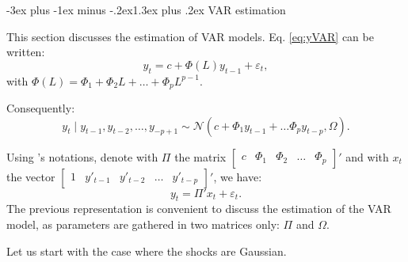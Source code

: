 \documentclass[
  11pt,
]{book}
\makeatletter
\renewcommand\section{\@startsection{section}{1}{\z@}
  {-3ex plus -1ex minus -.2ex}{1.3ex plus .2ex}
  {\normalfont\Large\bfseries\color{TextbookInk}}}
\theoremstyle{definition}
\theoremstyle{definition}
\theoremstyle{definition}
\theoremstyle{definition}
\theoremstyle{remark}
\makeatother
\begin{document}
\section{VAR estimation}\label{estimVAR}

This section discusses the estimation of VAR models. Eq. \eqref{eq:yVAR} can be written:
\[
y_{t}=c+\Phi(L)y_{t-1}+\varepsilon_{t},
\]
with \(\Phi(L) = \Phi_1 + \Phi_2 L + \dots + \Phi_p L^{p-1}\).

Consequently:
\[
y_{t}\mid y_{t-1},y_{t-2},\ldots,y_{-p+1}\sim \mathcal{N}(c+\Phi_{1}y_{t-1}+\ldots\Phi_{p}y_{t-p},\Omega).
\]

Using \citet{Hamilton_1994}'s notations, denote with \(\Pi\) the matrix \(\left[\begin{array}{ccccc}
c & \Phi_{1} & \Phi_{2} & \ldots & \Phi_{p}\end{array}\right]'\) and with \(x_{t}\) the vector \(\left[\begin{array}{ccccc}
1 & y'_{t-1} & y'_{t-2} & \ldots & y'_{t-p}\end{array}\right]'\), we have:
\begin{equation}
y_{t}= \Pi'x_{t} + \varepsilon_{t}. \label{eq:PIVAR}
\end{equation}
The previous representation is convenient to discuss the estimation of the VAR model, as parameters are gathered in two matrices only: \(\Pi\) and \(\Omega\).

Let us start with the case where the shocks are Gaussian.
\end{document}
